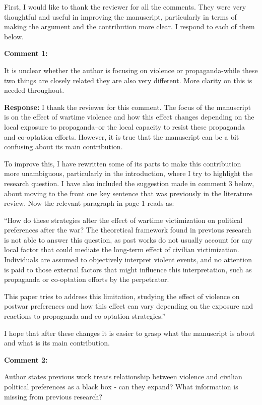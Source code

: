 \documentclass[12pt, a4paper, notitlepage]{article}
\begin{document}
First, I would like to thank the reviewer for all the comments. They were very thoughtful and useful in improving the manuscript, particularly in terms of making the argument and the contribution more clear. I respond to each of them below.

\vspace{15pt}
\noindent\textbf{Comment 1:}
\begin{displayquote}
It is unclear whether the author is focusing on violence or propaganda-while these two things are closely related they are also very different. More clarity on this is needed throughout.
\end{displayquote}

\noindent\textbf{Response:} I thank the reviewer for this comment. The focus of the manuscript is on the effect of wartime violence and how this effect changes depending on the local exposure to propaganda--or the local capacity to resist these propaganda and co-optation efforts. However, it is true that the manuscript can be a bit confusing about its main contribution.

To improve this, I have rewritten some of its parts to make this contribution more unambiguous, particularly in the introduction, where I try to highlight the research question. I have also included the suggestion made in comment 3 below, about moving to the front one key sentence that was previously in the literature review. Now the relevant paragraph in page 1 reads as:


``How do these strategies alter the effect of wartime victimization on political preferences after the war?
The theoretical framework found in previous research is not able to answer this question, as past works do not usually account for any local factor that could mediate the long-term effect of civilian victimization.
Individuals are assumed to objectively interpret violent events, and no attention is paid to those external factors that might influence this interpretation, such as propaganda or co-optation efforts by the perpetrator.

This paper tries to address this limitation, studying the effect of violence on postwar preferences and how this effect can vary depending on the exposure and reactions to propaganda and co-optation strategies.''

I hope that after these changes it is easier to grasp what the manuscript is about and what is its main contribution.

\vspace{15pt}
\noindent\textbf{Comment 2:}
\begin{displayquote}
Author states previous work treats relationship between violence and civilian political preferences as a black box - can they expand? What information is missing from previous research?
\end{displayquote}
\end{document}
